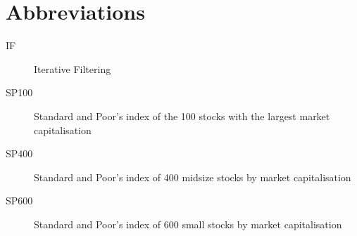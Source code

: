 \chapter*{Abbreviations}\label{abbr}
\begin{description}
\item[IF] Iterative Filtering
\item[SP100] Standard and Poor's index of the 100 stocks with the largest market capitalisation
\item[SP400] Standard and Poor's index of 400 midsize stocks by market capitalisation
\item[SP600] Standard and Poor's index of 600 small stocks by market capitalisation

\end{description}
